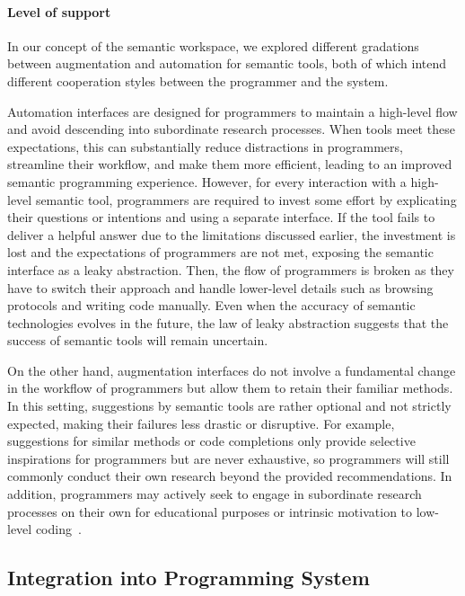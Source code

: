 \paragraph{Level of support}
\label{par:discussion/experience/process/support}

In our concept of the semantic workspace, we explored different gradations between augmentation and automation for semantic tools, both of which intend different cooperation styles between the programmer and the system.

Automation interfaces are designed for programmers to maintain a high-level flow and avoid descending into subordinate research processes.
When tools meet these expectations, this can substantially reduce distractions in programmers, streamline their workflow, and make them more efficient, leading to an improved semantic programming experience.
However, for every interaction with a high-level semantic tool, programmers are required to invest some effort by explicating their questions or intentions and using a separate interface.
If the tool fails to deliver a helpful answer due to the limitations discussed earlier, the investment is lost and the expectations of programmers are not met, exposing the semantic interface as a leaky abstraction.
Then, the flow of programmers is broken as they have to switch their approach and handle lower-level details such as browsing protocols and writing code manually.
Even when the accuracy of semantic technologies evolves in the future, the law of leaky abstraction suggests that the success of semantic tools will remain uncertain.

On the other hand, augmentation interfaces do not involve a fundamental change in the workflow of programmers but allow them to retain their familiar methods.
In this setting, suggestions by semantic tools are rather optional and not strictly expected, making their failures less drastic or disruptive.
For example, suggestions for similar methods or code completions only provide selective inspirations for programmers but are never exhaustive, so programmers will still commonly conduct their own research beyond the provided recommendations.
In addition, programmers may actively seek to engage in subordinate research processes on their own for educational purposes or intrinsic motivation to low-level coding~\cite{tanimoto2023five}.

\subsection*{Integration into Programming System}
\label{sec:discussion/experience/integration}

